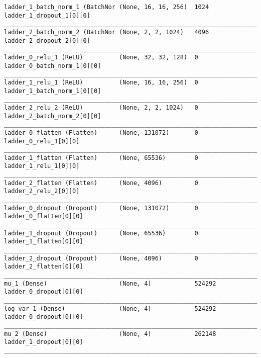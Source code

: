 \begin{lstlisting}[caption={dSprites-\ac{VLAE} Encoder},captionpos=b,basicstyle=\tiny, label={lst:dsprites-vlae-encoder}]
ladder_1_batch_norm_1 (BatchNor (None, 16, 16, 256)  1024        ladder_1_dropout_1[0][0]
__________________________________________________________________________________________________
ladder_2_batch_norm_2 (BatchNor (None, 2, 2, 1024)   4096        ladder_2_dropout_2[0][0]
__________________________________________________________________________________________________
ladder_0_relu_1 (ReLU)          (None, 32, 32, 128)  0           ladder_0_batch_norm_1[0][0]
__________________________________________________________________________________________________
ladder_1_relu_1 (ReLU)          (None, 16, 16, 256)  0           ladder_1_batch_norm_1[0][0]
__________________________________________________________________________________________________
ladder_2_relu_2 (ReLU)          (None, 2, 2, 1024)   0           ladder_2_batch_norm_2[0][0]
__________________________________________________________________________________________________
ladder_0_flatten (Flatten)      (None, 131072)       0           ladder_0_relu_1[0][0]
__________________________________________________________________________________________________
ladder_1_flatten (Flatten)      (None, 65536)        0           ladder_1_relu_1[0][0]
__________________________________________________________________________________________________
ladder_2_flatten (Flatten)      (None, 4096)         0           ladder_2_relu_2[0][0]
__________________________________________________________________________________________________
ladder_0_dropout (Dropout)      (None, 131072)       0           ladder_0_flatten[0][0]
__________________________________________________________________________________________________
ladder_1_dropout (Dropout)      (None, 65536)        0           ladder_1_flatten[0][0]
__________________________________________________________________________________________________
ladder_2_dropout (Dropout)      (None, 4096)         0           ladder_2_flatten[0][0]
__________________________________________________________________________________________________
mu_1 (Dense)                    (None, 4)            524292      ladder_0_dropout[0][0]
__________________________________________________________________________________________________
log_var_1 (Dense)               (None, 4)            524292      ladder_0_dropout[0][0]
__________________________________________________________________________________________________
mu_2 (Dense)                    (None, 4)            262148      ladder_1_dropout[0][0]
__________________________________________________________________________________________________

\end{lstlisting}
